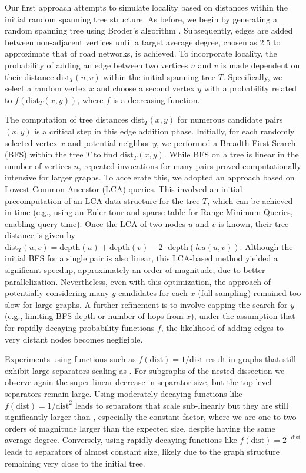 Our first approach attempts to simulate locality based on distances within the initial random spanning tree structure.
As before, we begin by generating a random spanning tree using Broder's algorithm \cite{broder_generating_1989}.
Subsequently, edges are added between non-adjacent vertices until a target average degree, chosen as \(2.5\) to approximate that of road networks, is achieved.
To incorporate locality, the probability of adding an edge between two vertices \(u\) and \(v\) is made dependent on their distance \( \text{dist}_T(u, v) \) within the initial spanning tree \(T\).
Specifically, we select a random vertex \(x\) and choose a second vertex \(y\) with a probability related to \(f(\text{dist}_T(x, y))\), where \(f\) is a decreasing function.

The computation of tree distances \(\text{dist}_T(x, y)\) for numerous candidate pairs \((x,y)\) is a critical step in this edge addition phase.
Initially, for each randomly selected vertex \(x\) and potential neighbor \(y\), we performed a Breadth-First Search (BFS) within the tree \(T\) to find \(\text{dist}_T(x, y)\).
While BFS on a tree is linear in the number of vertices \(n\), repeated invocations for many pairs proved computationally intensive for larger graphs.
To accelerate this, we adopted an approach based on Lowest Common Ancestor (LCA) queries.
This involved an initial precomputation of an LCA data structure for the tree \(T\), which can be achieved in  time (e.g., using an Euler tour and sparse table for Range Minimum Queries, enabling  query time).
Once the LCA of two nodes \(u\) and \(v\) is known, their tree distance is given by \(\text{dist}_T(u, v) = \text{depth}(u) + \text{depth}(v) - 2 \cdot \text{depth}(lca(u,v))\).
Although the initial BFS for a single pair is also linear, this LCA-based method yielded a significant speedup, approximately an order of magnitude, due to better parallelization.
Nevertheless, even with this optimization, the approach of potentially considering many \(y\) candidates for each \(x\) (full sampling) remained too slow for large graphs.
A further refinement is to involve capping the search for \(y\) (e.g., limiting BFS depth or number of hops from \(x\)), under the assumption that for rapidly decaying probability functions \(f\), the likelihood of adding edges to very distant nodes becomes negligible.

Experiments using functions such as \( f(\text{dist}) = 1/\text{dist} \) result in graphs that still exhibit large separators scaling as .
For subgraphs of the nested dissection we observe again the super-linear decrease in separator size, but the top-level separators remain large.
Using moderately decaying functions like \( f(\text{dist}) = 1/\text{dist}^2 \) leads to separators that scale sub-linearly but they are still significantly larger than , especially the constant factor, where we are one to two orders of magnitude larger than the expected size, despite having the same average degree.
Conversely, using rapidly decaying functions like \( f(\text{dist}) = 2^{-\text{dist}} \) leads to separators of almost constant size, likely due to the graph structure remaining very close to the initial tree.

